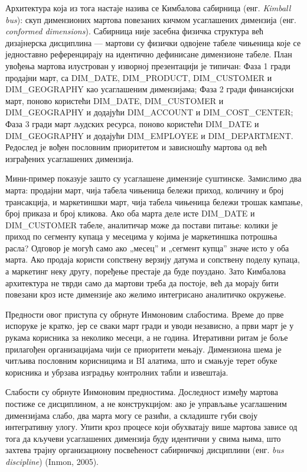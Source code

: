 Архитектура која из тога настаје назива се Кимбалова сабирница (енг. \textit{Kimball bus}): скуп димензионих мартова повезаних кичмом усаглашених димензија (енг. \textit{conformed dimensions}). Сабирница није засебна физичка структура већ дизајнерска дисциплина — мартови су физички одвојене табеле чињеница које се једноставно референцирају на идентично дефинисане димензионе табеле. План увођења мартова илустрован у изворној презентацији је типичан: Фаза 1 гради продајни март, са DIM\_DATE, DIM\_PRODUCT, DIM\_CUSTOMER и DIM\_GEOGRAPHY као усаглашеним димензијама; Фаза 2 гради финансијски март, поново користећи DIM\_DATE, DIM\_CUSTOMER и DIM\_GEOGRAPHY и додајући DIM\_ACCOUNT и DIM\_COST\_CENTER; Фаза 3 гради март људских ресурса, поново користећи DIM\_DATE и DIM\_GEOGRAPHY и додајући DIM\_EMPLOYEE и DIM\_DEPARTMENT. Редослед је вођен пословним приоритетом и зависношћу мартова од већ изграђених усаглашених димензија.

Мини-пример показује зашто су усаглашене димензије суштинске. Замислимо два марта: продајни март, чија табела чињеница бележи приход, количину и број трансакција, и маркетиншки март, чија табела чињеница бележи трошак кампање, број приказа и број кликова. Ако оба марта деле исте DIM\_DATE и DIM\_CUSTOMER табеле, аналитичар може да постави питање: колики је приход по сегменту купаца у месецима у којима је маркетиншка потрошња расла? Одговор је могућ само ако „месец” и „сегмент купца” значе исто у оба марта. Ако продаја користи сопствену верзију датума и сопствену поделу купаца, а маркетинг неку другу, поређење престаје да буде поуздано. Зато Кимбалова архитектура не тврди само да мартови треба да постоје, већ да морају бити повезани кроз исте димензије ако желимо интегрисано аналитичко окружење.

Предности овог приступа су обрнуте Инмоновим слабостима. Време до прве испоруке је кратко, јер се сваки март гради и уводи независно, а први март је у рукама корисника за неколико месеци, а не година. Итеративни ритам је боље прилагођен организацијама чији се приоритети мењају. Димензиона шема је читљива пословним корисницима и BI алатима, што и смањује терет обуке корисника и убрзава изградњу контролних табли и извештаја.

Слабости су обрнуте Инмоновим предностима. Доследност између мартова постиже се дисциплином, а не конструкцијом: ако је управљање усаглашеним димензијама слабо, два марта могу се разићи, а складиште губи своју интегративну улогу. Упити кроз процесе који обухватају више мартова зависе од тога да кључеви усаглашених димензија буду идентични у свима њима, што захтева трајну организациону посвећеност сабирничкој дисциплини (енг. \textit{bus discipline}) (Inmon, 2005).


